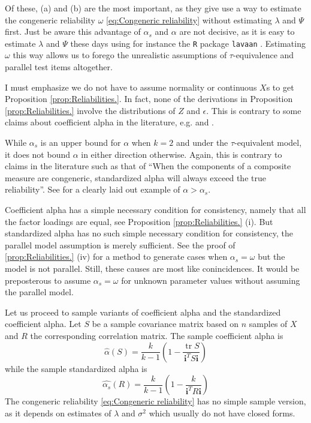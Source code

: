 \documentclass{article}
\theoremstyle{plain}
\theoremstyle{plain}
\theoremstyle{definition}
\theoremstyle{remark}
\theoremstyle{definition}
\theoremstyle{plain}
\theoremstyle{plain}
\theoremstyle{definition}
\DeclareMathOperator{\tr}{tr}
\begin{document}
Of these, (a) and (b) are the most important, as they give use a way to estimate the congeneric reliability $\omega$ \eqref{eq:Congeneric reliability} without estimating $\lambda$ and $\Psi$ first. Just be aware this advantage of $\alpha_s$ and $\alpha$ are not decisive, as it is easy to estimate $\lambda$ and $\Psi$ these days using for instance the \texttt{R} \citep{Team2013-tt} package \texttt{lavaan} \citep{Rosseel2012-yg}. Estimating $\omega$ this way allows us to forego the unrealistic assumptions of $\tau$-equivalence and parallel test items altogether.

I must emphasize we do not have to assume normality or continuous $X$s to get Proposition \ref{prop:Reliabilities.}. In fact, none of the derivations in Proposition \ref{prop:Reliabilities.} involve the distributions of $Z$ and $\epsilon$. This is contrary to some claims about coefficient alpha in the literature, e.g. \citep[][p.415]{McNeish2018-vu} and \citep[][p.21]{Zumbo2007-ap}.

While $\alpha_s$ is an upper bound for $\alpha$ when $k = 2$ and under the $\tau$-equivalent model, it does not bound $\alpha$ in either direction otherwise. Again, this is contrary to claims in the literature such as that of \citep[][p. 348]{Osburn2000-jd} \enquote{When the components of a composite measure are congeneric, standardized alpha will always exceed the true reliability}. See \citet[][p.450]{Falk2011-ae} for a clearly laid out example of $\alpha>\alpha_s$.

Coefficient alpha has a simple necessary condition for consistency, namely that all the factor loadings are equal, see Proposition \ref{prop:Reliabilities.} (i). But standardized alpha has no such simple necessary condition for consistency, the parallel model assumption is merely sufficient. See the proof of \ref{prop:Reliabilities.} (iv) for a method to generate cases when $\alpha_s = \omega$ but the model is not parallel. Still, these causes are most like conincidences. It would be preposterous to assume $\alpha_s = \omega$ for unknown parameter values without assuming the parallel model.

Let us proceed to sample variants of coefficient alpha and the standardized
coefficient alpha. Let $S$ be a sample covariance matrix based on
$n$ samples of $X$ and $R$ the corresponding correlation matrix.
The sample coefficient alpha is 
\begin{equation}
\widehat{\alpha}\left(S\right)=\frac{k}{k-1}\left(1-\frac{\tr{S}}{\mathbf{i}^{T}S\mathbf{i}}\right)\label{eq:sample coefficient alpha}
\end{equation}
while the sample standardized alpha is
\begin{equation}
\widehat{\alpha_s}(R)=\frac{k}{k-1}\left(1-\frac{k}{\mathbf{i}^{T}R\mathbf{i}}\right)\label{eq:sample standardized alpha}
\end{equation}
The congeneric reliability \eqref{eq:Congeneric reliability} has no
simple sample version, as it depends on estimates of $\lambda$ and
$\sigma^{2}$ which usually do not have closed forms.
\end{document}
